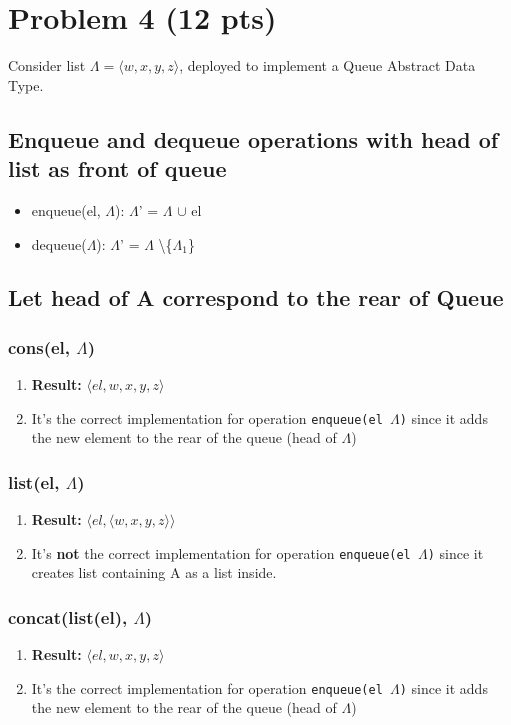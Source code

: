 \newpage

\section{Problem 4 (12 pts)}
Consider list $\Lambda = \langle w, x, y, z \rangle$, deployed to implement a Queue Abstract Data Type.

\subsection{Enqueue and dequeue operations with head of list as front of queue}

\begin{itemize}
    \item[] enqueue(el, $\Lambda$):  $\Lambda$' = $\Lambda$ $\cup$ el
    \item[] dequeue($\Lambda$): $\Lambda$' = $\Lambda$ \textbackslash \{$\Lambda_{1}$\}
\end{itemize}

\subsection{Let head of A correspond to the rear of Queue}

\subsubsection{cons(el, $\Lambda$)}
\begin{enumerate}
    \item[] \textbf{Result:} $\langle el, w, x, y, z \rangle$
    \item[] It's the correct implementation for operation \texttt{enqueue(el $\Lambda$)} since it adds the new element to the rear of the queue (head of $\Lambda$)
\end{enumerate}

\subsubsection{list(el, $\Lambda$)}
\begin{enumerate}
    \item[] \textbf{Result:} $\langle el, \langle w, x, y, z \rangle \rangle$
    \item[] It's \textbf{not} the correct implementation for operation \texttt{enqueue(el $\Lambda$)} since it creates list containing A as a list inside.
\end{enumerate}

\subsubsection{concat(list(el), $\Lambda$)}
\begin{enumerate}
    \item[] \textbf{Result:} $\langle el, w, x, y, z \rangle$
    \item[] It's the correct implementation for operation \texttt{enqueue(el $\Lambda$)} since it adds the new element to the rear of the queue (head of $\Lambda$)
\end{enumerate}
